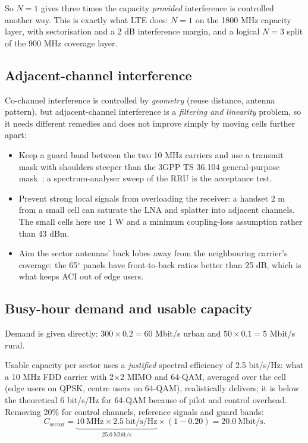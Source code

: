 \documentclass[9pt,a4paper]{article}
\begin{document}
So $N=1$ gives three times the capacity \emph{provided} interference is controlled another way.
This is exactly what LTE does: $N=1$ on the 1800 MHz capacity layer, with sectorisation and a
2 dB interference margin, and a logical $N=3$ split of the 900 MHz coverage layer.

\subsection{Adjacent-channel interference}
Co-channel interference is controlled by \emph{geometry} (reuse distance, antenna pattern), but
adjacent-channel interference is a \emph{filtering and linearity} problem, so it needs different
remedies and does not improve simply by moving cells further apart:

\begin{itemize}[leftmargin=1.4em,itemsep=1pt,topsep=2pt]
\item Keep a guard band between the two 10 MHz carriers and use a transmit mask with shoulders
steeper than the 3GPP TS 36.104 general-purpose mask~\cite{ts36104}; a spectrum-analyser sweep of the RRU is the
acceptance test.
\item Prevent strong local signals from overloading the receiver: a handset 2 m from a small cell
can saturate the LNA and splatter into adjacent channels. The small cells here use 1 W and a
minimum coupling-loss assumption rather than 43 dBm.
\item Aim the sector antennas' back lobes away from the neighbouring carrier's coverage: the
65$^\circ$ panels have front-to-back ratios better than 25 dB, which is what keeps ACI out of
edge users.
\end{itemize}

\subsection{Busy-hour demand and usable capacity}
Demand is given directly: $300\times0.2=60$ Mbit/s urban and $50\times0.1=5$ Mbit/s rural.

Usable capacity per sector uses a \emph{justified} spectral efficiency of 2.5 bit/s/Hz: what a
10 MHz FDD carrier with 2$\times$2 MIMO and 64-QAM, averaged over the cell (edge users on QPSK,
centre users on 64-QAM), realistically delivers; it is below the theoretical 6 bit/s/Hz for
64-QAM because of pilot and control overhead. Removing 20\% for control channels, reference
signals and guard bands:
\[
C_{\text{sector}} = \underbrace{10\ \text{MHz}\times2.5\ \text{bit/s/Hz}}_{25.0\ \text{Mbit/s}}
\times(1-0.20) = 20.0\ \text{Mbit/s}.
\]
\end{document}
